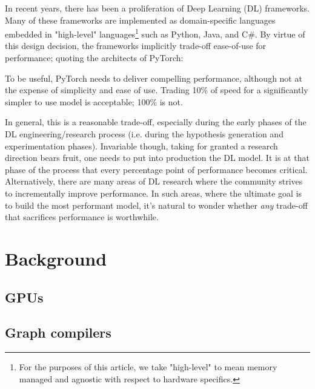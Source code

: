 \documentclass[sigconf]{acmart}
\begin{document}
In recent years, there has been a proliferation of Deep Learning (DL) frameworks\cite{paszke2019pytorch,abadi2016tensorflow,chen2015mxnet,cntk}.
Many of these frameworks are implemented as domain-specific languages embedded in "high-level" languages\footnote{For the purposes of this article, we take "high-level" to mean memory managed and agnostic with respect to hardware specifics.} such as Python, Java, and C\#.
By virtue of this design decision, the frameworks implicitly trade-off ease-of-use for performance; quoting the architects of PyTorch:
\begin{displayquote}
  To be useful, PyTorch needs to deliver compelling performance, although not at the expense of simplicity and ease of use.
  Trading 10\% of speed for a significantly simpler to use model is acceptable; 100\% is not.
\end{displayquote}
In general, this is a reasonable trade-off, especially during the early phases of the DL engineering/research process (i.e. during the hypothesis generation and experimentation phases).
Invariable though, taking for granted a research direction bears fruit, one needs to put into production the DL model.
It is at that phase of the process that every percentage point of performance becomes critical.
Alternatively, there are many areas of DL research where the community strives to incrementally improve performance\cite{abdelhamed2020ntire,hall2020probability,ILSVRC15}.
In such areas, where the ultimate goal is to build the most performant model, it's natural to wonder whether \textit{any} trade-off that sacrifices performance is worthwhile.


\section{Background}\label{sec:problem}

\subsection{GPUs}\label{subsec:gpus}

\subsection{Graph compilers}\label{subsec:graph-compilers}
\end{document}
